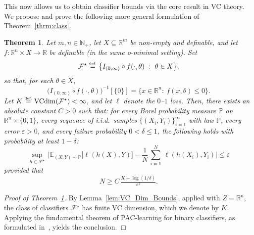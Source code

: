 \documentclass{article}
\newcommand{\eqdef}{\ensuremath{\stackrel{\mbox{\upshape\tiny def.}}{=}}}
\theoremstyle{plain}
\newtheorem{theorem}{Theorem}[section]
\theoremstyle{definition}
\theoremstyle{remark}
\newcommand{\calF}{\mathcal{F}}
\theoremstyle{plain}
\numberwithin{thm}{section}
\theoremstyle{definition}
\numberwithin{equation}{section}
\begin{document}
This now allows us to obtain classifier bounds via the core result in VC theory.
We propose and prove the following more general formulation of Theorem~\ref{thrm:class}.
\begin{theorem}
\label{thrm:class___generalized}
Let $m,n\in \mathbb{N}_+$, let $X\subseteq \mathbb{R}^m$ be non-empty and definable, and let
$f:\mathbb{R}^n\times X\to \mathbb{R}$ be definable (in the same o-minimal setting).  Set
\[
\calF^{\star}
 \eqdef  
\big\{ I_{(0,\infty)}\circ f(\cdot,\theta)\ :\ \theta\in X\big\},
\]
so that, for each $\theta\in X$,
\[
\big(I_{(0,\infty)}\circ f(\cdot,\theta)\big)^{-1}[\{0\}]
=
\{x\in\mathbb{R}^n:\ f(x,\theta)\le 0\}
.
\]
Let $K \eqdef \operatorname{VCdim}(\calF^{\star})<\infty$, and let $\ell$ denote the $0$--$1$ loss.
Then, there exists an absolute constant $C>0$ such that: for every Borel probability measure
$\mathbb{P}$ on $\mathbb{R}^n\times \{0,1\}$, every sequence of i.i.d.\ samples
$\{(X_i,Y_i)\}_{i=1}^{\infty}$ with law $\mathbb{P}$, every error $\varepsilon>0$, and every failure
probability $0<\delta \le 1$, the following holds with probability at least $1-\delta$:
\[
    \sup_{h\in \calF^{\star}}\,
    \biggl|
        \mathbb{E}_{(X,Y)\sim \mathbb{P}}\big[
            \ell(h(X),Y)
        \big]
        -
        \frac1{N}\,\sum_{i=1}^N\,
            \ell(h(X_i),Y_i)
    \biggr|
    \le
    \varepsilon
\]
provided that
\[
N
\ge
   C\,\tfrac{K+\log(1/\delta)}{\varepsilon^2}
.
\]
\end{theorem}
\begin{proof}[{Proof of Theorem~\ref{thrm:class___generalized}}]
By Lemma~\ref{lem:VC_Dim_Bounds}, applied with $Z=\mathbb{R}^n$, the class of classifiers
$\calF^{\star}$ has finite VC dimension, which we denote by $K$.
Applying the fundamental theorem of PAC-learning for binary classifiers, as formulated in~\citep[Theorem 6.7 (1)]{shalev2014understanding},
yields the conclusion.
\end{proof}
\end{document}
